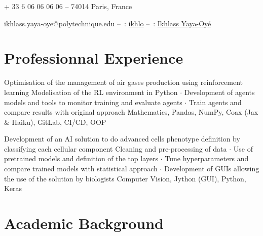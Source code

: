 \documentclass[a4paper,
		varspacetitle=-2mm, %
		varspacesection=2.5mm, %
		vartopmargin=1.3cm,  %
		varbottommargin=0.5cm %
	]{cv}
\begin{document}
\vspace{-2mm}
\begin{center}
    + 33 6 06 06 06 06 -- 74014 Paris, France
    
    ikhlass.yaya-oye@polytechnique.edu -- \faGithub \,: \href{https://github.com/ikhlo}{ikhlo} -- \faLinkedinSquare  \,: \href{https://www.linkedin.com/in/ikhlassyo/}{Ikhlass Yaya-Oyé}
\end{center}
\vspace{0.2mm}



\section{Professionnal Experience}
\vspace{2mm}
 
\vspace{3mm}

{Optimisation of the management of air gases production using reinforcement learning
}
{Modelisation of the RL environment in Python {\large $\cdot$} Development of agents models and tools to monitor training and evaluate agents {\large $\cdot$} Train agents and compare results with original approach
}
{Mathematics, Pandas, NumPy, Coax (Jax \& Haiku), GitLab, CI/CD, OOP
}
\vspace{5mm}

{Development of an AI solution to do advanced cells phenotype definition by classifying each cellular component
}
{Cleaning and pre-processing of data {\large $\cdot$} Use of pretrained models and definition of the top layers {\large $\cdot$} Tune hyperparameters and compare trained models with statistical approach {\large $\cdot$} Development of GUIs allowing the use of the solution by biologists
}
{Computer Vision, Jython (GUI), Python, Keras
}




\section{Academic Background}
\vspace{2mm}
\vspace{3mm}
\end{document}
